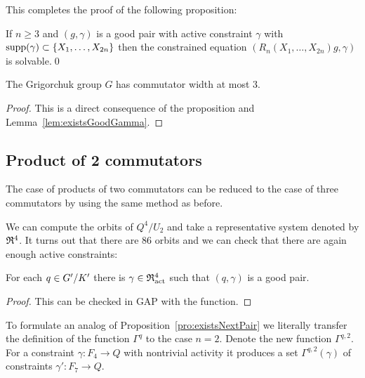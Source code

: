 \documentclass[a4paper,11pt]{amsart}
\begin{document}
This completes the proof of the following proposition:
\begin{pro}\label{pro:solvableConstraintedEquations}
 If $n\geq3$ and $(g,\gamma)$ is a good pair with active constraint $\gamma$ with $\operatorname{{supp}}(\gamma)\subset\{X_1,\dotsc,X_{2n}\}$
 then the constrained equation $(R_n(X_1,\dotsc,X_{2n})g,\gamma)$ is solvable.\qed
\end{pro}
\begin{cor}
 The Grigorchuk group $G$ has commutator width at most $3$.
\end{cor}
\begin{proof}
 This is a direct consequence of the proposition and Lemma~\ref{lem:existsGoodGamma}.
\end{proof}

\subsection{Product of 2 commutators}
The case of products of two commutators can be reduced to the case of three 
commutators by using the same method as before.

We can compute the orbits of $Q^4/U_2$ and take a representative system 
denoted by $\mathfrak{R}^4$.
It turns out that there are $86$ orbits and we can check that there are again enough active constraints:
\begin{lem} \label{lem:existsGoodGammaForRed4}
 For each $q\in{G'/K'}$ there is $\gamma\in \mathfrak{R}^4_{\operatorname{act}}$ such that $(q,\gamma)$ is a 
 good pair.
\end{lem}
\begin{proof}
 This can be checked in GAP with the function\newline {}.
\end{proof}

  To formulate an analog of Proposition~\ref{pro:existsNextPair} we literally transfer the definition 
  of the function $\Gamma^{q}$ to the case $n=2$. Denote the new function $\Gamma^{q,2}$.
  For a constraint $\gamma\colon F_{4} \to Q$ with nontrivial activity it produces
  a set $\Gamma^{q,2}(\gamma)$ of constraints $\gamma'\colon F_{7}\to Q$.
\end{document}
